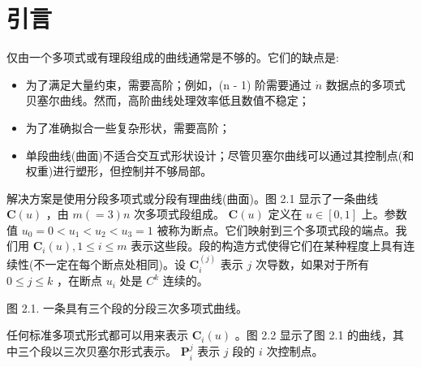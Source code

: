 \documentclass[../main.tex]{subfiles}
\begin{document}
\section{引言}
仅由一个多项式或有理段组成的曲线通常是不够的。它们的缺点是:

\begin{itemize}
\item 为了满足大量约束，需要高阶；例如，(n - 1) 阶需要通过 \(\dot{n}\) 数据点的多项式贝塞尔曲线。然而，高阶曲线处理效率低且数值不稳定；
\end{itemize}

\begin{itemize}
\item 为了准确拟合一些复杂形状，需要高阶；
\end{itemize}

\begin{itemize}
\item 单段曲线(曲面)不适合交互式形状设计；尽管贝塞尔曲线可以通过其控制点(和权重)进行塑形，但控制并不够局部。
\end{itemize}

解决方案是使用分段多项式或分段有理曲线(曲面)。图 2.1 显示了一条曲线 \(\mathbf{C}\left( u\right)\) ，由 \(m\left( { = 3}\right) n\) 次多项式段组成。 \(\mathbf{C}\left( u\right)\) 定义在 \(u \in  \left\lbrack  {0,1}\right\rbrack\) 上。参数值 \({u}_{0} = 0 < {u}_{1} < {u}_{2} < {u}_{3} = 1\) 被称为断点。它们映射到三个多项式段的端点。我们用 \({\mathbf{C}}_{i}\left( u\right) ,1 \leq  i \leq  m\) 表示这些段。段的构造方式使得它们在某种程度上具有连续性(不一定在每个断点处相同)。设 \({\mathbf{C}}_{i}^{\left( j\right) }\) 表示 \(j\) 次导数，如果对于所有 \(0 \leq  j \leq  k\) ，在断点 \({u}_{i}\) 处是 \({C}^{k}\) 连续的。

\begin{center}
\begin{minipage}{14cm}
\vspace*{.6\baselineskip}
\centering
{}
\par\smallskip
图 2.1. 一条具有三个段的分段三次多项式曲线。
\end{minipage}
\end{center}

任何标准多项式形式都可以用来表示 \({\mathbf{C}}_{i}\left( u\right)\) 。图 2.2 显示了图 2.1 的曲线，其中三个段以三次贝塞尔形式表示。 \({\mathbf{P}}_{i}^{j}\) 表示 \(j\) 段的 \(i\) 次控制点。
\end{document}
